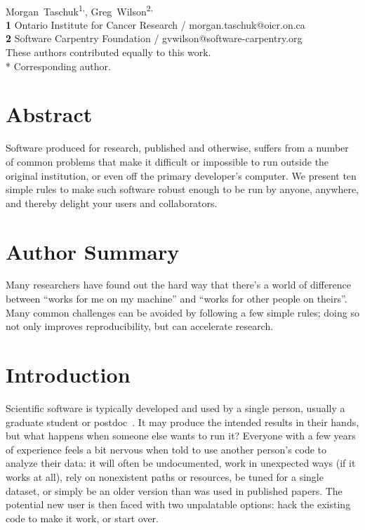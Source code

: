 \documentclass[10pt,letterpaper]{article}
\date{}
\begin{document}
\vspace*{0.2in}

\begin{flushleft}
{\Large
\textbf{}
}
\newline
\\
{Morgan~Taschuk}\textsuperscript{1,\ddag *},
{Greg~Wilson}\textsuperscript{2,\ddag}
\\
\textbf{1} Ontario Institute for Cancer Research / morgan.taschuk@oicr.on.ca
\\
\textbf{2} Software Carpentry Foundation / gvwilson@software-carpentry.org
\\
\bigskip
{\ddag} These authors contributed equally to this work.
\\
* Corresponding author.
\end{flushleft}

\section*{Abstract}

Software produced for research, published and otherwise, suffers from
a number of common problems that make it difficult or impossible to
run outside the original institution, or even off the primary
developer's computer.  We present ten simple rules to make such
software robust enough to be run by anyone, anywhere, and thereby
delight your users and collaborators.

\section*{Author Summary}

Many researchers have found out the hard way that there's a world of
difference between ``works for me on my machine'' and ``works for
other people on theirs''.  Many common challenges can be avoided by
following a few simple rules; doing so not only improves
reproducibility, but can accelerate research.

\section*{Introduction}

Scientific software is typically developed and used by a single
person, usually a graduate student or postdoc~\cite{prins2015}.  It
may produce the intended results in their hands, but what happens when
someone else wants to run it? Everyone with a few years of experience
feels a bit nervous when told to use another person's code to analyze
their data: it will often be undocumented, work in unexpected ways (if
it works at all), rely on nonexistent paths or resources, be tuned for
a single dataset, or simply be an older version than was used in
published papers.  The potential new user is then faced with two
unpalatable options: hack the existing code to make it work, or start
over.
\end{document}
